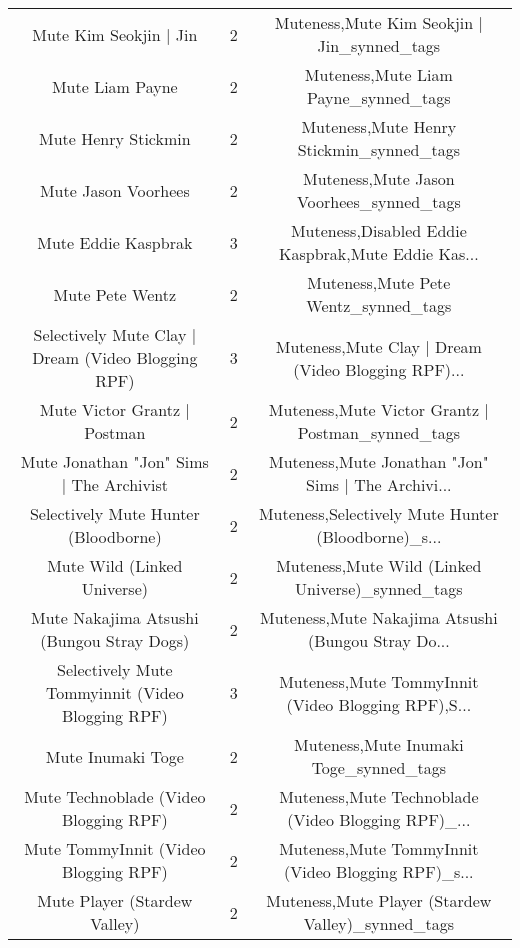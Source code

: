 \begin{table}[h!]
{\begin{tabular}{|c|c|c|}
                            Mute Kim Seokjin | Jin &          2 &        Muteness,Mute Kim Seokjin | Jin\_synned\_tags \\
                                   Mute Liam Payne &          2 &               Muteness,Mute Liam Payne\_synned\_tags \\
                               Mute Henry Stickmin &          2 &           Muteness,Mute Henry Stickmin\_synned\_tags \\
                               Mute Jason Voorhees &          2 &           Muteness,Mute Jason Voorhees\_synned\_tags \\
                               Mute Eddie Kaspbrak &          3 & Muteness,Disabled Eddie Kaspbrak,Mute Eddie Kas... \\
                                   Mute Pete Wentz &          2 &               Muteness,Mute Pete Wentz\_synned\_tags \\
Selectively Mute Clay | Dream (Video Blogging RPF) &          3 & Muteness,Mute Clay | Dream (Video Blogging RPF)... \\
                      Mute Victor Grantz | Postman &          2 &  Muteness,Mute Victor Grantz | Postman\_synned\_tags \\
          Mute Jonathan "Jon" Sims | The Archivist &          2 & Muteness,Mute Jonathan "Jon" Sims | The Archivi... \\
              Selectively Mute Hunter (Bloodborne) &          2 & Muteness,Selectively Mute Hunter (Bloodborne)\_s... \\
                       Mute Wild (Linked Universe) &          2 &   Muteness,Mute Wild (Linked Universe)\_synned\_tags \\
         Mute Nakajima Atsushi (Bungou Stray Dogs) &          2 & Muteness,Mute Nakajima Atsushi (Bungou Stray Do... \\
  Selectively Mute Tommyinnit (Video Blogging RPF) &          3 & Muteness,Mute TommyInnit (Video Blogging RPF),S... \\
                                 Mute Inumaki Toge &          2 &             Muteness,Mute Inumaki Toge\_synned\_tags \\
             Mute Technoblade (Video Blogging RPF) &          2 & Muteness,Mute Technoblade (Video Blogging RPF)\_... \\
              Mute TommyInnit (Video Blogging RPF) &          2 & Muteness,Mute TommyInnit (Video Blogging RPF)\_s... \\
                      Mute Player (Stardew Valley) &          2 &  Muteness,Mute Player (Stardew Valley)\_synned\_tags \\

\end{tabular}}
\end{table}
